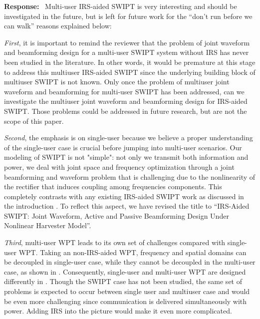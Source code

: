 \documentclass{article}
\newcounter{reviewer}
\newcounter{response}[reviewer]
\newenvironment{response}
	{\refstepcounter{response} \medskip \noindent \textbf{Response:}\ }
	{\medskip}
\begin{document}
\begin{reviewer}
		\begin{response}
			Multi-user IRS-aided SWIPT is very interesting and should be investigated in the future, but is left for future work for the ``don't run before we can walk'' reasons explained below:

			\emph{First}, it is important to remind the reviewer that the problem of joint waveform and beamforming design for a multi-user SWIPT system without IRS has never been studied in the literature. In other words, it would be premature at this stage to address this multiuser IRS-aided SWIPT since the underlying building block of multiuser SWIPT is not known. Only once the problem of multiuser joint waveform and beamforming for multi-user SWIPT has been addressed, can we investigate the multiuser joint waveform and beamforming design for IRS-aided SWIPT. Those problems could be addressed in future research, but are not the scope of this paper.

			\emph{Second}, the emphasis is on single-user because we believe a proper understanding of the single-user case is crucial before jumping into multi-user scenarios. Our modeling of SWIPT is not "simple": not only we transmit both information and power, we deal with joint space and frequency optimization through a joint beamforming and waveform problem that is challenging due to the nonlinearity of the rectifier that induces coupling among frequencies components. This completely contrasts with any existing IRS-aided SWIPT work as discussed in the introduction \cite{M-Wu2020b,M-Tang2019,M-Wu2020a}. To reflect this aspect, we have revised the title to ``IRS-Aided SWIPT: Joint Waveform, Active and Passive Beamforming Design Under Nonlinear Harvester Model''.

			\emph{Third}, multi-user WPT leads to its own set of challenges compared with single-user WPT. Taking an non-IRS-aided WPT, frequency and spatial domains can be decoupled in single-user case, while they cannot be decoupled in the multi-user case, as shown in \cite{M-Clerckx2016a,M-Huang2017}. Consequently, single-user and multi-user WPT are designed differently in \cite{M-Clerckx2016a,M-Huang2017}. Though the SWIPT case has not been studied, the same set of problems is expected to occur between single user and multiuser case and would be even more challenging since communication is delivered simultaneously with power. Adding IRS into the picture would make it even more complicated.
			\label{re:1.2}
		\end{response}


\end{reviewer}
\end{document}
